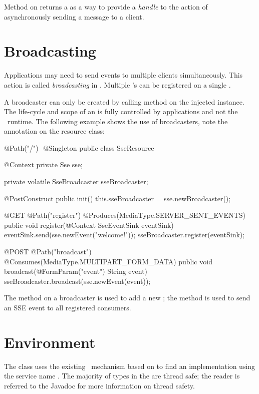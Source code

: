 Method  on  returns a  as a way to provide a \emph{handle} to the action of asynchronously sending a message to a client.

\section{Broadcasting}
\label{sse_broadcasting}

Applications may need to send events to multiple clients simultaneously. This action is called \emph{broadcasting} in \jaxrs. Multiple 's can be registered on a single . 

A broadcaster can only be created by calling method  on the injected  instance. The life-cycle and scope of an  is fully controlled by applications and not the \jaxrs\ runtime. The following example shows the use of broadcasters, note the  annotation on the resource class:

\begin{listing}{1}
@Path("/") 
@Singleton
public class SseResource {
	
  @Context
  private Sse sse;
  
  private volatile SseBroadcaster sseBroadcaster;
	
  @PostConstruct
  public init() {
    this.sseBroadcaster = sse.newBroadcaster();
  }  
	
  @GET
  @Path("register")
  @Produces(MediaType.SERVER_SENT_EVENTS)
  public void register(@Context SseEventSink eventSink) {
    eventSink.send(sse.newEvent("welcome!"));
    sseBroadcaster.register(eventSink);
  }  
	
  @POST
  @Path("broadcast")
  @Consumes(MediaType.MULTIPART_FORM_DATA)
  public void broadcast(@FormParam("event") String event) { 
    sseBroadcaster.broadcast(sse.newEvent(event));
  } 
}
\end{listing}

The  method on a broadcaster is used to add a new ; the
 method is used to send an SSE event to all registered consumers.

\section{Environment}
\label{sse_environment}

The  class uses the existing \jaxrs\ mechanism based on  to find an implementation using the service name . The majority of types in the  are thread safe; the reader is referred to the Javadoc for more information on thread safety.


